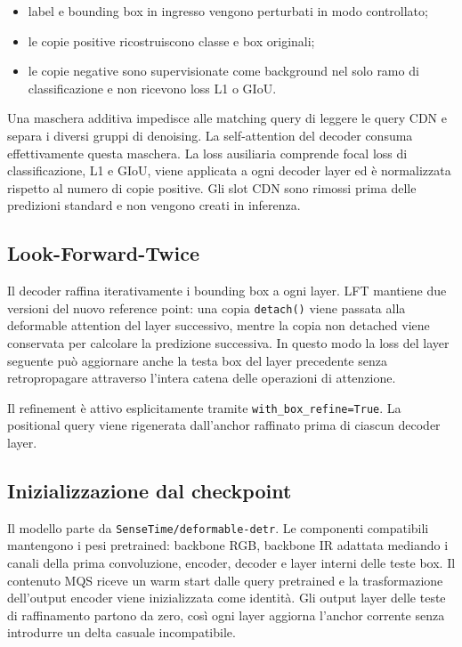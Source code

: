 \documentclass[a4paper,11pt]{article}
\begin{document}
\begin{itemize}
    \item label e bounding box in ingresso vengono perturbati in modo controllato;
    \item le copie positive ricostruiscono classe e box originali;
    \item le copie negative sono supervisionate come background nel solo ramo di classificazione e non ricevono loss L1 o GIoU.
\end{itemize}

Una maschera additiva impedisce alle matching query di leggere le query CDN e separa i diversi gruppi di denoising. La self-attention del decoder consuma effettivamente questa maschera. La loss ausiliaria comprende focal loss di classificazione, L1 e GIoU, viene applicata a ogni decoder layer ed è normalizzata rispetto al numero di copie positive. Gli slot CDN sono rimossi prima delle predizioni standard e non vengono creati in inferenza.

\subsection{Look-Forward-Twice}

Il decoder raffina iterativamente i bounding box a ogni layer. LFT mantiene due versioni del nuovo reference point: una copia \texttt{detach()} viene passata alla deformable attention del layer successivo, mentre la copia non detached viene conservata per calcolare la predizione successiva. In questo modo la loss del layer seguente può aggiornare anche la testa box del layer precedente senza retropropagare attraverso l'intera catena delle operazioni di attenzione.

Il refinement è attivo esplicitamente tramite \texttt{with\_box\_refine=True}. La positional query viene rigenerata dall'anchor raffinato prima di ciascun decoder layer.

\subsection{Inizializzazione dal checkpoint}

Il modello parte da \texttt{SenseTime/deformable-detr}. Le componenti compatibili mantengono i pesi pretrained: backbone RGB, backbone IR adattata mediando i canali della prima convoluzione, encoder, decoder e layer interni delle teste box. Il contenuto MQS riceve un warm start dalle query pretrained e la trasformazione dell'output encoder viene inizializzata come identità. Gli output layer delle teste di raffinamento partono da zero, così ogni layer aggiorna l'anchor corrente senza introdurre un delta casuale incompatibile.
\end{document}
